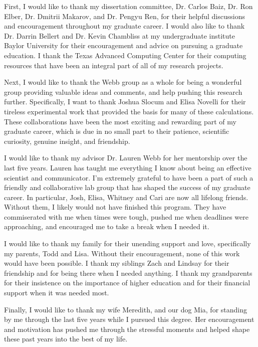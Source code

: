 First, I would like to thank my dissertation committee, Dr. Carlos Baiz, Dr. Ron Elber, Dr. Dmitrii Makarov, and Dr. Pengyu Ren, for their helpful discussions and encouragement throughout my graduate career. 
I would also like to thank Dr. Darrin Bellert and Dr. Kevin Chambliss at my undergraduate institute Baylor University for their encouragement and advice on pursuing a graduate education. 
I thank the Texas Advanced Computing Center for their computing resources that have been an integral part of all of my research projects. 

Next, I would like to thank the Webb group as a whole for being a wonderful group providing valuable ideas and comments, and help pushing this research further. 
Specifically, I want to thank Joshua Slocum and Elisa Novelli for their tireless experimental work that provided the basis for many of these calculations. 
These collaborations have been the most exciting and rewarding part of my graduate career, which is due in no small part to their patience, scientific curiosity, genuine insight, and friendship.  

I would like to thank my advisor Dr. Lauren Webb for her mentorship over the last five years. 
Lauren has taught me everything I know about being an effective scientist and communicator. 
I'm extremely grateful to have been a part of such a friendly and collaborative lab group that has shaped the success of my graduate career. 
In particular, Josh, Elisa, Whitney and Cari are now all lifelong friends. 
Without them, I likely would not have finished this program. 
They have commiserated with me when times were tough, pushed me when deadlines were approaching, and encouraged me to take a break when I needed it. 

I would like to thank my family for their unending support and love, specifically my parents, Todd and Lisa. 
Without their encouragement, none of this work would have been possible.  
I thank my siblings Zach and Lindsay for their friendship and for being there when I needed anything. 
I thank my grandparents for their insistence on the importance of higher education and for their financial support when it was needed most. 

Finally, I would like to thank my wife Meredith, and our dog Mia, for standing by me through the last five years while I pursued this degree. 
Her encouragement and motivation has pushed me through the stressful moments and helped shape these past years into the best of my life. 
